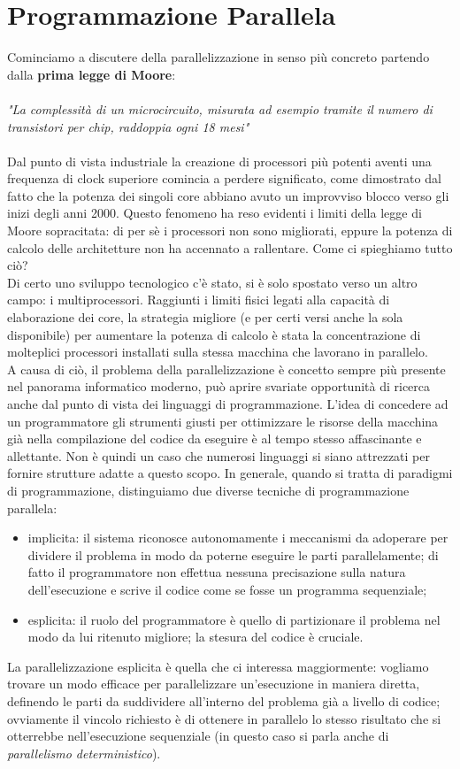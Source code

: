 \chapter{Programmazione Parallela}
Cominciamo a discutere della parallelizzazione in senso più concreto partendo dalla \textbf{prima legge di Moore}:\\\\
\textit{"La complessità di un microcircuito, misurata ad esempio tramite il numero di transistori per chip, raddoppia ogni 18 mesi"}\\\\
Dal punto di vista industriale la creazione di processori più potenti aventi una frequenza di clock superiore comincia a perdere significato, come dimostrato dal fatto che la potenza dei singoli core abbiano avuto un improvviso blocco verso gli inizi degli anni 2000. Questo fenomeno ha reso evidenti i limiti della legge di Moore sopracitata: di per sè i processori non sono migliorati, eppure la potenza di calcolo delle architetture non ha accennato a rallentare. Come ci spieghiamo tutto ciò?\\
Di certo uno sviluppo tecnologico c'è stato, si è solo spostato verso un altro campo: i multiprocessori. Raggiunti i limiti fisici legati alla capacità di elaborazione dei core, la strategia migliore (e per certi versi anche la sola disponibile) per aumentare la potenza di calcolo è stata la concentrazione di molteplici processori installati sulla stessa macchina che lavorano in parallelo.\\
A causa di ciò, il problema della parallelizzazione è concetto sempre più presente nel panorama informatico moderno, può aprire svariate opportunità di ricerca anche dal punto di vista dei linguaggi di programmazione. L'idea di concedere ad un programmatore gli strumenti giusti per ottimizzare le risorse della macchina già nella compilazione del codice da eseguire è al tempo stesso affascinante e allettante. Non è quindi un caso che numerosi linguaggi si siano attrezzati per fornire strutture adatte a questo scopo.
\newpage
\noindent
In generale, quando si tratta di paradigmi di programmazione, distinguiamo due diverse tecniche di programmazione parallela:
\begin{itemize}
\item{implicita: il sistema riconosce autonomamente i meccanismi da adoperare per dividere il problema in modo da poterne eseguire le parti parallelamente; di fatto il programmatore non effettua nessuna precisazione sulla natura dell'esecuzione e scrive il codice come se fosse un programma sequenziale;}
\item{esplicita: il ruolo del programmatore è quello di partizionare il problema nel modo da lui ritenuto migliore; la stesura del codice è cruciale.}
\end{itemize}
La parallelizzazione esplicita è quella che ci interessa maggiormente: vogliamo trovare un modo efficace per parallelizzare un'esecuzione in maniera diretta, definendo le parti da suddividere all'interno del problema già a livello di codice; ovviamente il vincolo richiesto è di ottenere in parallelo lo stesso risultato che si otterrebbe nell'esecuzione sequenziale (in questo caso si parla anche di \textit{parallelismo deterministico}). 

